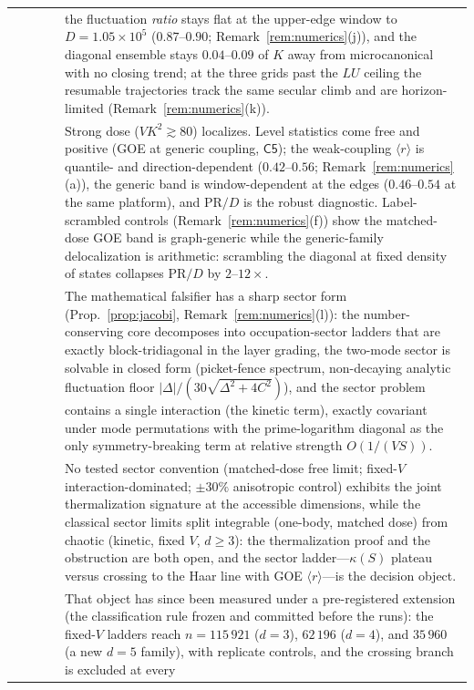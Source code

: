\begin{longtable}{@{}p{}p{}p{}p{}p{}@{}}
 & & & & the fluctuation \emph{ratio} stays flat at the
upper-edge window to $D=1.05\times10^{5}$ ($0.87$--$0.90$; Remark~\ref{rem:numerics}(j)),
and the
diagonal ensemble stays $0.04$--$0.09$ of $K$ away from microcanonical
with no closing trend; at the three grids past the $LU$ ceiling the resumable
trajectories track the same secular climb and are horizon-limited
(Remark~\ref{rem:numerics}(k)).\\
 & & & & Strong dose ($VK^{2}\gtrsim80$) localizes. Level
statistics come free and positive (GOE at generic coupling, $\mathsf{C5}$); the
weak-coupling $\langle r\rangle$ is quantile- and direction-dependent
($0.42$--$0.56$; Remark~\ref{rem:numerics}(a)), the generic band is window-dependent at
the edges ($0.46$--$0.54$ at the same platform), and $\mathrm{PR}/D$ is the robust
diagnostic. Label-scrambled controls (Remark~\ref{rem:numerics}(f)) show the matched-dose
GOE band is graph-generic while the generic-family delocalization is arithmetic:
scrambling the diagonal at fixed density of states collapses $\mathrm{PR}/D$ by
$2$--$12\times$.\\
 & & & & The mathematical falsifier has a sharp sector form
(Prop.~\ref{prop:jacobi}, Remark~\ref{rem:numerics}(l)): the number-conserving
core decomposes into occupation-sector ladders that are exactly
block-tridiagonal in the layer grading, the two-mode sector is solvable in
closed form (picket-fence spectrum, non-decaying analytic fluctuation floor
$|\Delta|/(30\sqrt{\Delta^{2}+4C^{2}})$), and the sector problem contains a
single interaction (the kinetic term), exactly covariant under mode
permutations with the prime-logarithm diagonal as the only symmetry-breaking
term at relative strength $O(1/(VS))$.\\
 & & & & No tested sector convention
(matched-dose free limit; fixed-$V$ interaction-dominated; $\pm30\%$
anisotropic control) exhibits the joint thermalization signature at the
accessible dimensions, while the classical sector limits split integrable
(one-body, matched dose) from chaotic (kinetic, fixed $V$, $d\ge3$): the
thermalization proof and the obstruction are both open, and the sector
ladder---$\kappa(S)$ plateau versus crossing to the Haar line with GOE
$\langle r\rangle$---is the decision object.\\
 & & & & That object has since been
measured under a pre-registered extension (the classification rule frozen
and committed before the runs): the fixed-$V$ ladders reach $n=115\,921$
($d=3$), $62\,196$ ($d=4$), and $35\,960$ (a new $d=5$ family), with
replicate controls, and the crossing branch is excluded at every

\end{longtable}
